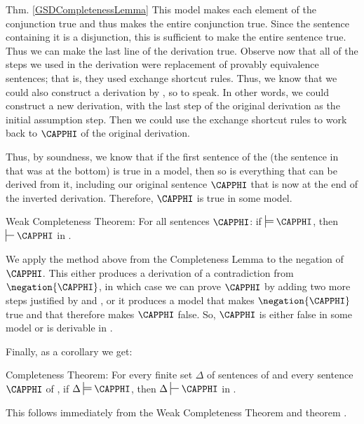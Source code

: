 \begin{PROOFOF}{Thm. \ref{GSDCompletenessLemma}}
This model makes each element of the conjunction true and thus makes the entire conjunction true. 
Since the sentence containing it is a disjunction, this is sufficient to make the entire sentence true.
Thus we can make the last line of the derivation true.
Observe now that all of the steps we used in the derivation were replacement of provably equivalence sentences;
that is, they used exchange shortcut rules.
Thus, we know that we could also construct a derivation by , so to speak.  In other words, we could construct a new derivation, with the last step of the original derivation as the initial assumption step.  Then we could use the exchange shortcut rules to work back to $\CAPPHI$ of the original derivation.

Thus, by soundness, we know that if the first sentence of the  (the sentence in  that was at the bottom) is true in a model, then so is everything that can be derived from it, including our original sentence $\CAPPHI$ that is now at the end of the inverted derivation. 
Therefore, $\CAPPHI$ is true in some model. 
\end{PROOFOF}
\begin{THEOREM}{ Weak \GSD{} Completeness Theorem:}
For all \GSL{} sentences $\CAPPHI$: if $\sdtstile{}{}\CAPPHI$, then $\sststile{}{}\CAPPHI$ in \GSD{}.
\end{THEOREM}
\begin{PROOF}
We apply the method above from the \GSD{} Completeness Lemma to the negation of $\CAPPHI$. 
This either produces a derivation of a contradiction from $\negation{\CAPPHI}$, in which case we can prove $\CAPPHI$ by adding two more steps justified by  and , or it produces a model that makes $\negation{\CAPPHI}$ true and that therefore makes $\CAPPHI$ false. So, $\CAPPHI$ is either false in some model or is derivable in \GSD{}. 
\end{PROOF}
\noindent{}Finally, as a corollary we get:
\begin{THEOREM}{ \GSD{} Completeness Theorem:}
For every finite set $\Delta$ of sentences of \GSL{} and every sentence $\CAPPHI$ of \GSL{}, if $\Delta\sdtstile{}{}\CAPPHI$, then $\Delta\sststile{}{}\CAPPHI$ in \GSD{}.
\end{THEOREM}
\begin{PROOF}
This follows immediately from the Weak \GSD{} Completeness Theorem and theorem .
\end{PROOF}

